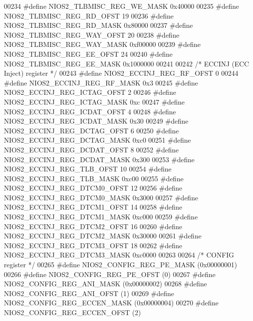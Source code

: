 \begin{DoxyCode}
{{{00234 \textcolor{preprocessor}{#define NIOS2\_TLBMISC\_REG\_WE\_MASK 0x40000}
00235 \textcolor{preprocessor}{#define NIOS2\_TLBMISC\_REG\_RD\_OFST 19}
00236 \textcolor{preprocessor}{#define NIOS2\_TLBMISC\_REG\_RD\_MASK 0x80000}
00237 \textcolor{preprocessor}{#define NIOS2\_TLBMISC\_REG\_WAY\_OFST 20}
00238 \textcolor{preprocessor}{#define NIOS2\_TLBMISC\_REG\_WAY\_MASK 0xf00000}
00239 \textcolor{preprocessor}{#define NIOS2\_TLBMISC\_REG\_EE\_OFST 24}
00240 \textcolor{preprocessor}{#define NIOS2\_TLBMISC\_REG\_EE\_MASK 0x1000000}
00241 
00242 \textcolor{comment}{/* ECCINJ (ECC Inject) register */}
00243 \textcolor{preprocessor}{#define NIOS2\_ECCINJ\_REG\_RF\_OFST 0}
00244 \textcolor{preprocessor}{#define NIOS2\_ECCINJ\_REG\_RF\_MASK 0x3}
00245 \textcolor{preprocessor}{#define NIOS2\_ECCINJ\_REG\_ICTAG\_OFST 2}
00246 \textcolor{preprocessor}{#define NIOS2\_ECCINJ\_REG\_ICTAG\_MASK 0xc}
00247 \textcolor{preprocessor}{#define NIOS2\_ECCINJ\_REG\_ICDAT\_OFST 4}
00248 \textcolor{preprocessor}{#define NIOS2\_ECCINJ\_REG\_ICDAT\_MASK 0x30}
00249 \textcolor{preprocessor}{#define NIOS2\_ECCINJ\_REG\_DCTAG\_OFST 6}
00250 \textcolor{preprocessor}{#define NIOS2\_ECCINJ\_REG\_DCTAG\_MASK 0xc0}
00251 \textcolor{preprocessor}{#define NIOS2\_ECCINJ\_REG\_DCDAT\_OFST 8}
00252 \textcolor{preprocessor}{#define NIOS2\_ECCINJ\_REG\_DCDAT\_MASK 0x300}
00253 \textcolor{preprocessor}{#define NIOS2\_ECCINJ\_REG\_TLB\_OFST 10}
00254 \textcolor{preprocessor}{#define NIOS2\_ECCINJ\_REG\_TLB\_MASK 0xc00}
00255 \textcolor{preprocessor}{#define NIOS2\_ECCINJ\_REG\_DTCM0\_OFST 12}
00256 \textcolor{preprocessor}{#define NIOS2\_ECCINJ\_REG\_DTCM0\_MASK 0x3000}
00257 \textcolor{preprocessor}{#define NIOS2\_ECCINJ\_REG\_DTCM1\_OFST 14}
00258 \textcolor{preprocessor}{#define NIOS2\_ECCINJ\_REG\_DTCM1\_MASK 0xc000}
00259 \textcolor{preprocessor}{#define NIOS2\_ECCINJ\_REG\_DTCM2\_OFST 16}
00260 \textcolor{preprocessor}{#define NIOS2\_ECCINJ\_REG\_DTCM2\_MASK 0x30000}
00261 \textcolor{preprocessor}{#define NIOS2\_ECCINJ\_REG\_DTCM3\_OFST 18}
00262 \textcolor{preprocessor}{#define NIOS2\_ECCINJ\_REG\_DTCM3\_MASK 0xc0000}
00263 
00264 \textcolor{comment}{/* CONFIG register */}
00265 \textcolor{preprocessor}{#define NIOS2\_CONFIG\_REG\_PE\_MASK (0x00000001)}
00266 \textcolor{preprocessor}{#define NIOS2\_CONFIG\_REG\_PE\_OFST (0)}
00267 \textcolor{preprocessor}{#define NIOS2\_CONFIG\_REG\_ANI\_MASK (0x00000002)}
00268 \textcolor{preprocessor}{#define NIOS2\_CONFIG\_REG\_ANI\_OFST (1)}
00269 \textcolor{preprocessor}{#define NIOS2\_CONFIG\_REG\_ECCEN\_MASK (0x00000004)}
00270 \textcolor{preprocessor}{#define NIOS2\_CONFIG\_REG\_ECCEN\_OFST (2)}
}}}
\end{DoxyCode}
